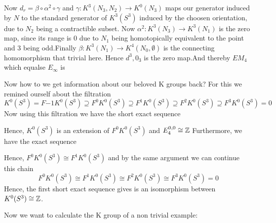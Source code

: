 \begin{example}
	Now $d_r=\beta\circ \alpha^2\circ \gamma$ and $\gamma: K^3(N_3,N_2)\to K^0(N_3)$ maps our generator induced by $N$ to the standard generator of $K^3(S^3)$ induced by the choosen orientation, due to $N_2$ being a contractible subset. Now $\alpha^2:  K^3(N_3) \to  K^3(N_1)$ is the zero map, since its range is $0$ due to $N_1$ being homotopically equivalent to the point and $3$ being odd.Finally $\beta: K^3(N_1) \to K^4(N_0,\emptyset)$ is the connecting homomorphism that trivial here. Hence $d^3,0_3$ is the zero map.And thereby $EM_4$ which equalse $E_\infty$ is  
	\begin{center}
	\end{center}Now how to we get information about our beloved K groups back? For this we remined ourself about the filtration 
	\begin{equation*}
		K^0(S^3)=F{-1}K^0(S^3)\supseteq F^0K^0(S^3)\supseteq F^1 K^0(S^3) \supseteq F^2K^0(S^3)\supseteq F^3K^0(S^3)=0
	\end{equation*}
	Now using this filtration we have the short exact sequence
	\begin{center}
	\end{center}Hence, $K^0(S^3)$ is an extension of $F^0K^0(S^3)$ and $E^{0,0}_4\cong \mathbb{Z}$ 
	Furthermore, we have the exact sequence
	\begin{center}
	\end{center} Hence, $F^0K^0(S^3)\cong F^1K^0(S^3)$ and by the same argument we can continue this chain 
	\begin{equation*}
		F^0K^0(S^3)\cong F^1K^0(S^3)\cong F^2K^0(S^3)\cong F^3K^0(S^3)=0
	\end{equation*}
	Hence, the first short exact sequence gives is an isomorphism between $K^0(S^3)\cong \mathbb{Z}$.
	\end{example} 
	Now we want to calculate the K group of a non trivial example:
	
		
		
